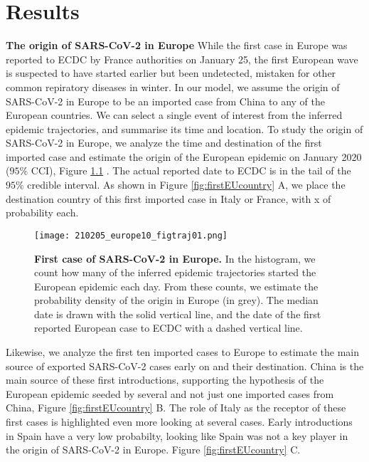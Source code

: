 \chapter{Results}

\textbf{The origin of SARS-CoV-2 in Europe} 
While the first case in Europe was reported to ECDC by France authorities on January 25, the first European wave is suspected to have started earlier but been undetected, mistaken for other common repiratory diseases in winter. In our model, we assume the origin of SARS-CoV-2 in Europe to be an imported case from China to any of the European countries. We can select a single event of interest from the inferred epidemic trajectories, and summarise its time and location. To study the origin of SARS-CoV-2 in Europe, we analyze the time and destination of the first imported case and estimate the origin of the European epidemic on January 2020 ($95\%$ CCI), Figure \ref{fig:firstEU} . The actual reported date to ECDC is in the tail of the $95\%$ credible interval. As shown in Figure \ref{fig:firstEUcountry} A, we place the destination country of this first imported case in Italy or France, with x of probability each.  

\begin{figure}[h]
    \centering
    \texttt{[image: 210205\_europe10\_figtraj01.png]}
    \caption{\textbf{First case of SARS-CoV-2 in Europe.} In the histogram, we count how many of the inferred epidemic trajectories started the European epidemic each day. From these counts, we estimate the probability density of the origin in Europe (in grey). The median date is drawn with the solid vertical line, and the date of the first reported European case to ECDC with a dashed vertical line.}
    \label{fig:firstEU}
\end{figure}

Likewise, we analyze the first ten imported cases to Europe to estimate the main source of exported SARS-CoV-2 cases early on and their destination. China is the main source of these first introductions, supporting the hypothesis of the European epidemic seeded by several and not just one imported cases from China, Figure \ref{fig:firstEUcountry} B.  The role of Italy as the receptor of these first cases is highlighted even more looking at several cases. Early introductions in Spain have a very low probabilty, looking like Spain was not a key player in the origin of SARS-CoV-2 in Europe.   Figure \ref{fig:firstEUcountry} C.  

